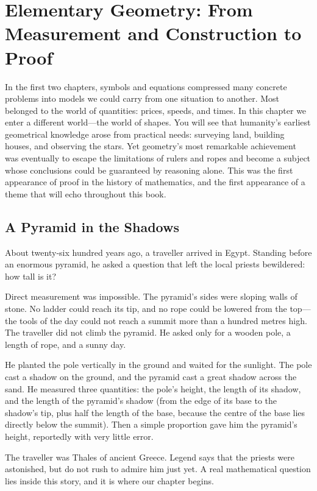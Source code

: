 \chapter{Elementary Geometry: From Measurement and Construction to Proof}

In the first two chapters, symbols and equations compressed many concrete problems into models we could carry from one situation to another. Most belonged to the world of quantities: prices, speeds, and times. In this chapter we enter a different world---the world of shapes. You will see that humanity's earliest geometrical knowledge arose from practical needs: surveying land, building houses, and observing the stars. Yet geometry's most remarkable achievement was eventually to escape the limitations of rulers and ropes and become a subject whose conclusions could be guaranteed by reasoning alone. This was the first appearance of proof in the history of mathematics, and the first appearance of a theme that will echo throughout this book.

\section{A Pyramid in the Shadows}

About twenty-six hundred years ago, a traveller arrived in Egypt. Standing before an enormous pyramid, he asked a question that left the local priests bewildered: how tall is it?

Direct measurement was impossible. The pyramid's sides were sloping walls of stone. No ladder could reach its tip, and no rope could be lowered from the top---the tools of the day could not reach a summit more than a hundred metres high. The traveller did not climb the pyramid. He asked only for a wooden pole, a length of rope, and a sunny day.

He planted the pole vertically in the ground and waited for the sunlight. The pole cast a shadow on the ground, and the pyramid cast a great shadow across the sand. He measured three quantities: the pole's height, the length of its shadow, and the length of the pyramid's shadow (from the edge of its base to the shadow's tip, plus half the length of the base, because the centre of the base lies directly below the summit). Then a simple proportion gave him the pyramid's height, reportedly with very little error.

The traveller was Thales of ancient Greece. Legend says that the priests were astonished, but do not rush to admire him just yet. A real mathematical question lies inside this story, and it is where our chapter begins.

